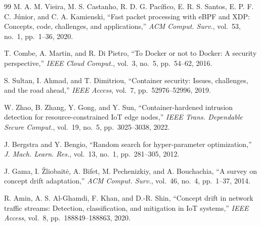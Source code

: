 \documentclass[journal]{IEEEtran}
\begin{document}
\begin{thebibliography}{99}
M. A. M. Vieira, M. S. Castanho, R. D. G. Pac\'{i}fico, E. R. S. Santos, E. P. F. C. J\'{u}nior, and C. A. Kamienski, ``Fast packet processing with {eBPF} and {XDP}: Concepts, code, challenges, and applications,'' \textit{ACM Comput. Surv.}, vol.~53, no.~1, pp.~1--36, 2020.

T. Combe, A. Martin, and R. Di Pietro, ``To {D}ocker or not to {D}ocker: A security perspective,'' \textit{IEEE Cloud Comput.}, vol.~3, no.~5, pp.~54--62, 2016.

S. Sultan, I. Ahmad, and T. Dimitriou, ``Container security: Issues, challenges, and the road ahead,'' \textit{IEEE Access}, vol.~7, pp.~52976--52996, 2019.

W. Zhao, B. Zhang, Y. Gong, and Y. Sun, ``Container-hardened intrusion detection for resource-constrained {IoT} edge nodes,'' \textit{IEEE Trans. Dependable Secure Comput.}, vol.~19, no.~5, pp.~3025--3038, 2022.

J. Bergstra and Y. Bengio, ``Random search for hyper-parameter optimization,'' \textit{J. Mach. Learn. Res.}, vol.~13, no.~1, pp.~281--305, 2012.

J. Gama, I. \v{Z}liobait\.{e}, A. Bifet, M. Pechenizkiy, and A. Bouchachia, ``A survey on concept drift adaptation,'' \textit{ACM Comput. Surv.}, vol.~46, no.~4, pp.~1--37, 2014.

R. Amin, A. S. Al-Ghamdi, F. Khan, and D.-R. Shin, ``Concept drift in network traffic streams: Detection, classification, and mitigation in {IoT} systems,'' \textit{IEEE Access}, vol.~8, pp.~188849--188863, 2020.

\end{thebibliography}
\end{document}
